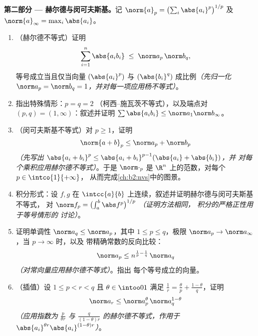 \begin{problem}
\medskip
\noindent\textbf{第二部分 --- 赫尔德与闵可夫斯基。}记
$\norm{a}_p = \bigl(\sum_i \abs{a_i}^p\bigr)^{1/p}$ 及
$\norm{a}_\infty = \max_i\abs{a_i}$。
\begin{enumerate}[resume]
  \item （赫尔德不等式）证明
        \[
        \sum_{i=1}^{n}\abs{a_ib_i} \;\leq\;
        \norm a_p\,\norm b_q ,
        \]
        等号成立当且仅当向量 $(\abs{a_i}^p)$ 与
        $(\abs{b_i}^q)$ 成比例\emph{（先归一化
        $\norm a_p = \norm b_q = 1$，并对每一项应用杨不等式）}。
  \item 指出特殊情形：$p = q = 2$
        （柯西–施瓦茨不等式），以及端点对 $(p, q) = (1,
        \infty)$：叙述并证明 $\sum\abs{a_ib_i} \leq
        \norm a_1\norm b_\infty$。
  \item （闵可夫斯基不等式）对 $p \geq 1$，证明
        \[
        \norm{a + b}_p \leq \norm a_p + \norm b_p
        \]
        \emph{（先写出 $\abs{a_i + b_i}^p \leq \abs{a_i +
        b_i}^{p-1}(\abs{a_i} + \abs{b_i})$，并
        对每个乘积应用赫尔德不等式）}。于是 $\norm\cdot_p$ 是
        $\R^n$ 上的范数，对每个 $p \in \intco{1}{+\infty}$，
        从而完成\cref{ch:b2:nvs}中的图景。
  \item 积分形式：设 $f, g$ 在
        $\intcc{a}{b}$ 上连续，叙述并证明赫尔德与闵可夫斯基不等式，
        对 $\norm f_p = \bigl(\int_a^b\abs
        f^p\bigr)^{1/p}$ \emph{（证明方法相同，
        积分的严格正性用于等号情形的
        讨论）}。
  \item 证明单调性 $\norm a_q \leq \norm a_p$，其中 $1
        \leq p \leq q$，极限 $\norm a_p \to
        \norm a_\infty$，当 $p \to \infty$ 时，以及
        带精确常数的反向比较：
        \[
        \norm a_p \leq n^{\frac1p - \frac1q}\,\norm a_q
        \]
        \emph{（对常向量应用赫尔德不等式）}。指出
        每个等号成立的向量。
  \item （插值）设 $1 \leq p < r < q$ 且 $\theta \in
        \intoo01$ 满足 $\frac1r = \frac\theta p +
        \frac{1-\theta}q$，证明
        \[
        \norm a_r \leq \norm a_p^{\theta}\,
        \norm a_q^{1-\theta}
        \]
        \emph{（应用指数为 $\frac{p}{\theta
        r}$ 与 $\frac{q}{(1-\theta)r}$ 的赫尔德不等式，作用于 $\abs{a_i}^{\theta
        r}\abs{a_i}^{(1-\theta)r}$）}。
\end{enumerate}


\end{problem}
